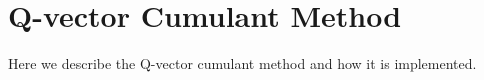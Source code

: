 \section{Q-vector Cumulant Method}
\label{qvc}
Here we describe the Q-vector cumulant method and how it is implemented.
